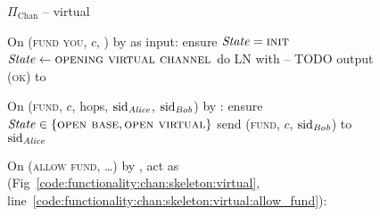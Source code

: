 \begin{figure}[H]
  \begin{protocolbox}{$\Pi_{\mathrm{Chan}}$ -- virtual}
    \begin{algorithmic}[1]
      \State {}
      \State {}
      \State On (\textsc{fund you}, $c$, \bob) by \charlie as input:
      \Indent
        \State ensure $\mathit{State} = \textsc{init}$
        \State $\mathit{State} \gets \textsc{opening virtual channel}$
        \State do LN with \bob{} -- TODO
        \State output (\textsc{ok}) to \charlie
      \EndIndent
      \Statex

      \State On (\textsc{fund}, $c$, hops, $\mathrm{sid}_{\mathit{Alice}}$,
      $\mathrm{sid}_{\mathit{Bob}}$) by \environment:
      \Indent
        \State ensure $\mathit{State} \in \{\textsc{open base}, \textsc{open
        virtual}\}$
          \State send (\textsc{fund}, $c$, $\mathrm{sid}_{\mathit{Bob}}$) to
          $\mathrm{sid}_{\mathit{Alice}}$
        \EndIf
      \EndIndent
      \Statex

      \State {}
      \State On (\textsc{allow fund}, \dots) by \charlie, act as \fchan
      (Fig~\ref{code:functionality:chan:skeleton:virtual},
      line~\ref{code:functionality:chan:skeleton:virtual:allow_fund}):
    \end{algorithmic}
  \end{protocolbox}
  \caption{}
  \label{code:protocol:chan:skeleton:virtual}
\end{figure}
